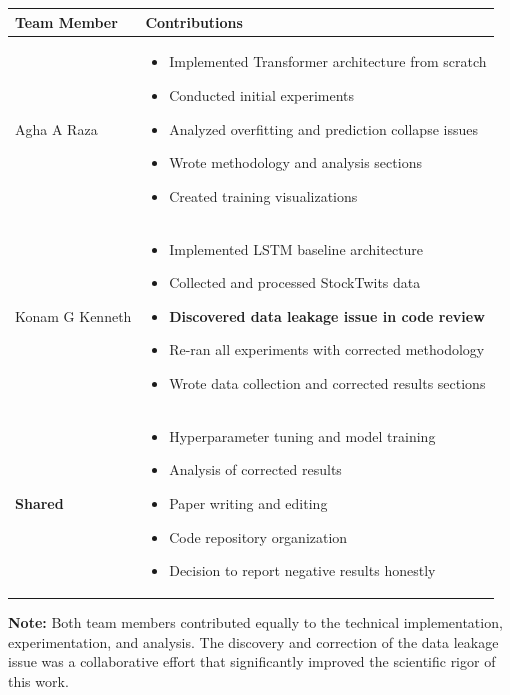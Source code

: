 \documentclass[10pt,twocolumn]{article}
\begin{document}
\begin{table}[h]
\centering
\begin{tabular}{p{3cm}p{10cm}}
\toprule
\textbf{Team Member} & \textbf{Contributions} \\
\midrule
Agha A Raza & 
\begin{itemize}
\item Implemented Transformer architecture from scratch
\item Conducted initial experiments
\item Analyzed overfitting and prediction collapse issues
\item Wrote methodology and analysis sections
\item Created training visualizations
\end{itemize} \\
\midrule
Konam G Kenneth & 
\begin{itemize}
\item Implemented LSTM baseline architecture
\item Collected and processed StockTwits data
\item \textbf{Discovered data leakage issue in code review}
\item Re-ran all experiments with corrected methodology
\item Wrote data collection and corrected results sections
\end{itemize} \\
\midrule
\textbf{Shared} & 
\begin{itemize}
\item Hyperparameter tuning and model training
\item Analysis of corrected results
\item Paper writing and editing
\item Code repository organization
\item Decision to report negative results honestly
\end{itemize} \\
\bottomrule
\end{tabular}
\end{table}

\textbf{Note:} Both team members contributed equally to the technical implementation, experimentation, and analysis. The discovery and correction of the data leakage issue was a collaborative effort that significantly improved the scientific rigor of this work.
\end{document}
